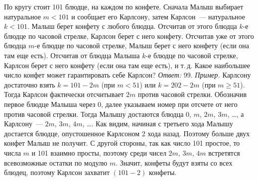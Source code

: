 \problem
По кругу стоит 101 блюдце, на каждом по конфете.
Сначала Малыш выбирает натуральное $m < 101$ и сообщает его Карлсону,
затем Карлсон~--- натуральное $k < 101$.
Малыш берет конфету с любого блюдца.
Отсчитав от этого блюдца $k$-е блюдце по часовой стрелке,
Карлсон берет с него конфету.
Отсчитав уже от этого блюдца $m$-е блюдце по часовой стрелке,
Малыш берет с него конфету (если она там еще есть).
Отсчитав от блюдца Малыша $k$-е блюдце по часовой стрелке,
Карлсон берет с него конфету (если она там еще есть), и т.\,д.
Какое наибольшее число конфет может гарантировать себе Карлсон?
\solution
\emph{Ответ:} 99.
\emph{Пример.}
Карлсону достаточно взять $k = 101 - 2 m$ (при $m < 51$) или $k = 202 - 2 m$
(при $m \geq 51$).
Тогда Карлсон фактически отсчитывает $2 m$ против часовой стрелки.
Обозначив первое блюдце Малыша через 0, далее указываем номер при отсчете от
него против часовой стрелки.
Тогда Малышу достаются блюдца $0$, $m$, $2 m$, $3 m$, \ldots,
а Карлсону~--- $2 m$, $3 m$, $4 m$, \ldots.
Как видим, начиная с третьего хода Малышу достается блюдце, опустошенное
Карлсоном 2 хода назад.
Поэтому больше двух конфет Малыш не получит.
С другой стороны, так как число 101 простое, то числа $m$ и 101 взаимно просты,
поэтому среди чисел $2 m$, $3 m$, $4 m$ встретятся всевозможные остатки по
модулю $m$.
Значит, конфеты будут взяты со всех блюдец, поэтому Карлсон захватит
$(101 - 2)$ конфеты.
\endproblem
